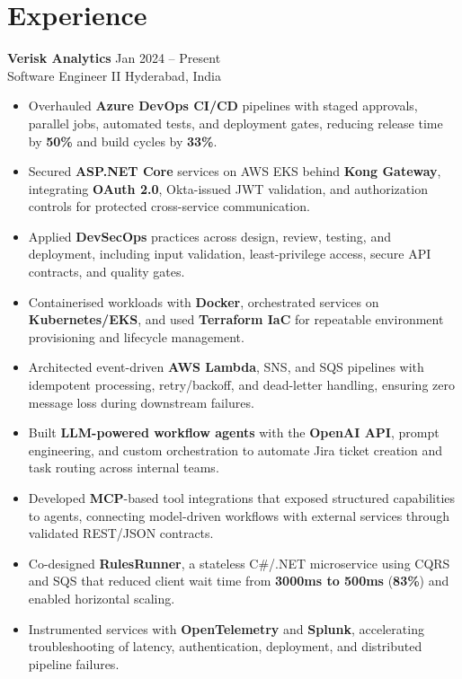 \documentclass[10pt,letterpaper]{article}
\newcommand{\resumeSubheading}[4]{%
  \textbf{#1} \hfill #2 \\
  #3 \hfill #4 \\
}
\begin{document}
\section*{Experience}
\resumeSubheading{Verisk Analytics}{Jan 2024 -- Present}{Software Engineer II}{Hyderabad, India}
\begin{itemize}
    \item Overhauled \textbf{Azure DevOps CI/CD} pipelines with staged approvals, parallel jobs, automated tests, and deployment gates, reducing release time by \textbf{50\%} and build cycles by \textbf{33\%}.
    \item Secured \textbf{ASP.NET Core} services on AWS EKS behind \textbf{Kong Gateway}, integrating \textbf{OAuth 2.0}, Okta-issued JWT validation, and authorization controls for protected cross-service communication.
    \item Applied \textbf{DevSecOps} practices across design, review, testing, and deployment, including input validation, least-privilege access, secure API contracts, and quality gates.
    \item Containerised workloads with \textbf{Docker}, orchestrated services on \textbf{Kubernetes/EKS}, and used \textbf{Terraform IaC} for repeatable environment provisioning and lifecycle management.
    \item Architected event-driven \textbf{AWS Lambda}, SNS, and SQS pipelines with idempotent processing, retry/backoff, and dead-letter handling, ensuring zero message loss during downstream failures.
    \item Built \textbf{LLM-powered workflow agents} with the \textbf{OpenAI API}, prompt engineering, and custom orchestration to automate Jira ticket creation and task routing across internal teams.
    \item Developed \textbf{MCP}-based tool integrations that exposed structured capabilities to agents, connecting model-driven workflows with external services through validated REST/JSON contracts.
    \item Co-designed \textbf{RulesRunner}, a stateless C\#/.NET microservice using CQRS and SQS that reduced client wait time from \textbf{3000ms to 500ms} (\textbf{83\%}) and enabled horizontal scaling.
    \item Instrumented services with \textbf{OpenTelemetry} and \textbf{Splunk}, accelerating troubleshooting of latency, authentication, deployment, and distributed pipeline failures.
\end{itemize}
\end{document}
